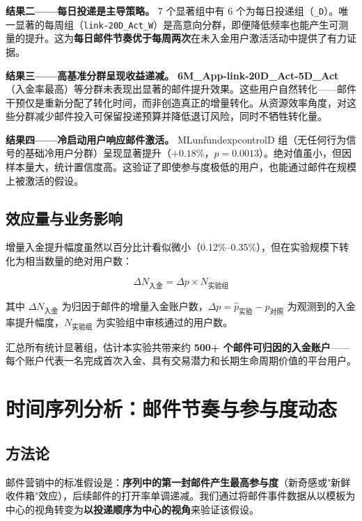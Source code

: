 \documentclass[12pt,a4paper]{ctexart}
\newcommand{\colname}[1]{{\ttfamily\renewcommand{\_}{\textunderscore\allowbreak}#1}}
\begin{document}
\textbf{结果二——每日投递是主导策略。}
7 个显著组中有 6 个为每日投递组（\texttt{\_D}）。唯一显著的每周组（\texttt{link-20D\_Act\_W}）是高意向分群，即便降低频率也能产生可测量的提升。这为\textbf{每日邮件节奏优于每周两次}在未入金用户激活活动中提供了有力证据。

\textbf{结果三——高基准分群呈现收益递减。}
\textbf{6M\_App-link-20D\_Act-5D\_Act}（入金率最高）等分群未表现出显著的邮件提升效果。这些用户自然转化——邮件干预仅是重新分配了转化时间，而非创造真正的增量转化。从资源效率角度，对这些分群减少邮件投入可保留投递预算并降低退订风险，同时不牺牲转化量。

\textbf{结果四——冷启动用户响应邮件激活。}
\colname{ML\_unfund\_exp\_control\_D} 组（无任何行为信号的基础冷用户分群）呈现显著提升（$+0.18\%$，$p = 0.0013$）。绝对值虽小，但因样本量大，统计置信度高。这验证了即使参与度极低的用户，也能通过邮件在规模上被激活的假设。

\subsection{效应量与业务影响}

增量入金提升幅度虽然以百分比计看似微小（0.12\%--0.35\%），但在实验规模下转化为相当数量的绝对用户数：

\begin{equation}
  \Delta N_{\text{入金}} = \Delta p \times N_{\text{实验组}}
\end{equation}

\noindent 其中 $\Delta N_{\text{入金}}$ 为归因于邮件的增量入金账户数，$\Delta p = \hat{p}_{\text{实验}} - p_{\text{对照}}$ 为观测到的入金率提升幅度，$N_{\text{实验组}}$ 为实验组中审核通过的用户数。

汇总所有统计显著组，估计本实验共带来约 \textbf{500+ 个邮件可归因的入金账户}——每个账户代表一名完成首次入金、具有交易潜力和长期生命周期价值的平台用户。

\clearpage
\section{时间序列分析：邮件节奏与参与度动态}

\subsection{方法论}

邮件营销中的标准假设是：\textbf{序列中的第一封邮件产生最高参与度}（新奇感或"新鲜收件箱"效应），后续邮件的打开率单调递减。我们通过将邮件事件数据从以模板为中心的视角转变为\textbf{以投递顺序为中心的视角}来验证该假设。
\end{document}
